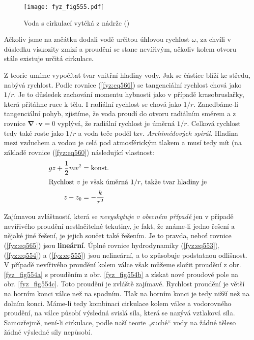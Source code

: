 {    \begin{figure}[ht!] %
      \centering
      \texttt{[image: fyz\_fig555.pdf]}
      \caption{Voda s cirkulací vytéká z nádrže
               (\cite[s.~752]{Feynman02})}
      \label{fyz_fig555}
    \end{figure}
    
    Ačkoliv jsme na začátku dodali vodě určitou úhlovou rychlost \(\omega\), za chvíli v důsledku 
    viskozity zmizí a proudění se stane nevířivým, ačkoliv kolem otvoru stále existuje určitá 
    cirkulace.
    
    Z teorie umíme vypočítat tvar vnitřní hladiny vody. Jak se částice blíží ke středu, nabývá 
    rychlost. Podle rovnice (\ref{fyz:eq566}) se tangenciální rychlost chová jako \(1/r\). Je to 
    důsledek zachování momentu hybnosti jako v případě krasobruslařky, která přitáhne ruce k tělu. 
    I radiální rychlost se chová jako \(1/r\). Zanedbáme-li tangenciální pohyb, zjistíme, že voda 
    proudí do otvoru radiálním směrem a z rovnice \(\symbf{\nabla}\cdot\bm{v} = 0\) vyplývá, že 
    radiální rychlost je úměrná \(1/r\). Celková rychlost tedy také roste jako \(1/r\) a voda teče 
    podél tzv. \emph{Archimédových spirál}. Hladina mezi vzduchem a vodou je celá pod atmosférickým 
    tlakem a musí tedy mít (na základě rovnice (\ref{fyz:eq560}) následující vlastnost:
    \begin{align*}
      gz + \dfrac{1}{2}mv^2 &= \text{konst}.                                           \\
      \shortintertext{Rychlost \(v\) je však úměrná \(1/r\), takže tvar hladiny je}
      z - z_0               &= - \dfrac{k}{r^2}
    \end{align*}
    
    Zajímavou zvláštností, která se \emph{nevyskytuje v obecném případě} jen v případě nevířivého 
    proudění nestlačitelné tekutiny, je fakt, že známe-li jedno řešení a nějaké jiné řešení, je 
    jejich součet také řešením. Je to pravda, neboť rovnice (\ref{fyz:eq565}) jsou 
    \textbf{lineární}. Úplné rovnice hydrodynamiky (\ref{fyz:eq553}), (\ref{fyz:eq554}) a 
    (\ref{fyz:eq555}) jsou nelineární, a to způsobuje podstatnou odlišnost. V případě nevířivého 
    proudění kolem válce však můžeme složit proudění z obr. \ref{fyz_fig554a} s prouděním z obr. 
    \ref{fyz_fig554b} a získat nové proudové pole na obr. \ref{fyz_fig554c}. Toto proudění je 
    zvláště zajímavé. Rychlost proudění je větší na horním konci válce než na spodním. Tlak na 
    horním konci je tedy nižší než na dolním konci. Máme-li tedy kombinaci cirkulace kolem válce a 
    vodorovného proudění, na válce působí výsledná svislá síla, která se nazývá vztlaková síla. 
    Samozřejmě, není-li cirkulace, podle naší teorie „suché“ vody na žádné těleso žádné výsledné 
    síly nepůsobí.
    
}
